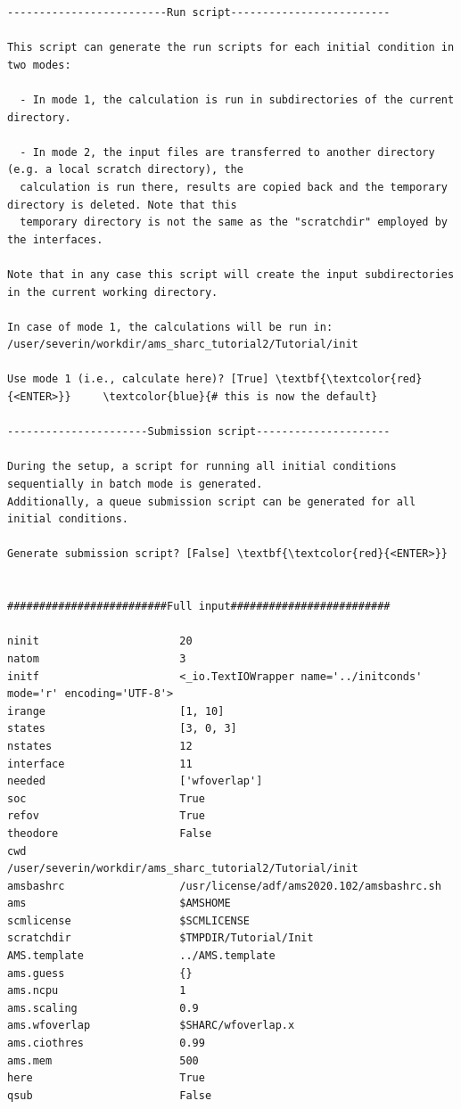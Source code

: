 \documentclass[a4paper,11pt,DIV=15,openany]{scrbook}
\begin{document}
\begin{oframed}
\begin{Verbatim}[commandchars=\\\{\}]
-------------------------Run script-------------------------

This script can generate the run scripts for each initial condition in two modes:

  - In mode 1, the calculation is run in subdirectories of the current directory.

  - In mode 2, the input files are transferred to another directory (e.g. a local scratch directory), the 
  calculation is run there, results are copied back and the temporary directory is deleted. Note that this 
  temporary directory is not the same as the "scratchdir" employed by the interfaces.

Note that in any case this script will create the input subdirectories in the current working directory.

In case of mode 1, the calculations will be run in:
/user/severin/workdir/ams_sharc_tutorial2/Tutorial/init

Use mode 1 (i.e., calculate here)? [True] \textbf{\textcolor{red}{<ENTER>}}     \textcolor{blue}{# this is now the default}

----------------------Submission script---------------------

During the setup, a script for running all initial conditions sequentially in batch mode is generated. 
Additionally, a queue submission script can be generated for all initial conditions.

Generate submission script? [False] \textbf{\textcolor{red}{<ENTER>}}


#########################Full input#########################

ninit                      20
natom                      3
initf                      <_io.TextIOWrapper name='../initconds' mode='r' encoding='UTF-8'>
irange                     [1, 10]
states                     [3, 0, 3]
nstates                    12
interface                  11
needed                     ['wfoverlap']
soc                        True
refov                      True
theodore                   False
cwd                        /user/severin/workdir/ams_sharc_tutorial2/Tutorial/init
amsbashrc                  /usr/license/adf/ams2020.102/amsbashrc.sh
ams                        $AMSHOME
scmlicense                 $SCMLICENSE
scratchdir                 $TMPDIR/Tutorial/Init
AMS.template               ../AMS.template
ams.guess                  {}
ams.ncpu                   1
ams.scaling                0.9
ams.wfoverlap              $SHARC/wfoverlap.x
ams.ciothres               0.99
ams.mem                    500
here                       True
qsub                       False


\end{Verbatim}
\end{oframed}
\end{document}

